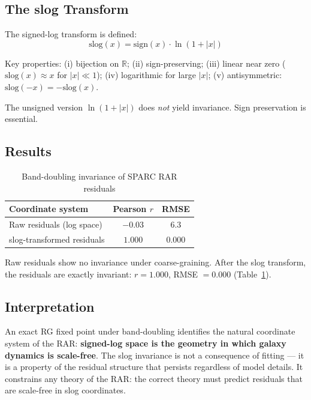 \documentclass[aps,prl,twocolumn,superscriptaddress,nofootinbib]{revtex4-2}
\begin{document}
\subsection{The slog Transform}

The signed-log transform is defined:
\begin{equation}
    \mathrm{slog}(x) = \mathrm{sign}(x) \cdot \ln(1 + |x|)
    \label{eq:slog}
\end{equation}

Key properties: (i) bijection on $\mathbb{R}$; (ii) sign-preserving; (iii) linear near zero ($\mathrm{slog}(x) \approx x$ for $|x| \ll 1$); (iv) logarithmic for large $|x|$; (v) antisymmetric: $\mathrm{slog}(-x) = -\mathrm{slog}(x)$.

The unsigned version $\ln(1 + |x|)$ does \emph{not} yield invariance. Sign preservation is essential.

\subsection{Results}

\begin{table}[h]
\caption{Band-doubling invariance of SPARC RAR residuals}
\label{tab:slog}
\begin{ruledtabular}
\begin{tabular}{lcc}
    Coordinate system & Pearson $r$ & RMSE \\
    \hline
    Raw residuals (log space) & $-0.03$ & $6.3$ \\
    slog-transformed residuals & $\mathbf{1.000}$ & $\mathbf{0.000}$ \\
\end{tabular}
\end{ruledtabular}
\end{table}

Raw residuals show no invariance under coarse-graining. After the slog transform, the residuals are exactly invariant: $r = 1.000$, RMSE $= 0.000$ (Table~\ref{tab:slog}).

\subsection{Interpretation}

An exact RG fixed point under band-doubling identifies the natural coordinate system of the RAR: \textbf{signed-log space is the geometry in which galaxy dynamics is scale-free}. The slog invariance is not a consequence of fitting — it is a property of the residual structure that persists regardless of model details. It constrains any theory of the RAR: the correct theory must predict residuals that are scale-free in slog coordinates.
\end{document}
